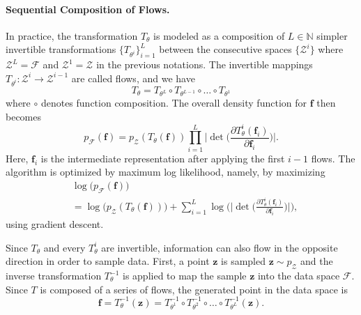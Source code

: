 \documentclass[letterpaper]{article} %
\begin{document}
\paragraph{Sequential Composition of Flows.}

In practice, the transformation $T_\theta$ is modeled as a composition of $L\in \mathbb{N}$ simpler invertible transformations $\{T_{\theta^i}\}_{i=1}^L$ between the consecutive spaces $\{\mathcal{Z}^i\}$ where $\mathcal{Z}^L = \mathcal{F} $ and $\mathcal{Z}^1 = \mathcal{Z}$ in the previous notations. The invertible mappings $T_{\theta^i}: \mathcal{Z}^i \rightarrow \mathcal{Z}^{i-1}$ are called flows, and we have 
\[T_\theta = T_{\theta^L} \circ T_{\theta^{L-1}} \circ \dots \circ T_{\theta^1}\]
where $\circ$ denotes function composition. The overall density function for $\mathbf{f}$ then becomes
\[p_\mathcal{F}(\mathbf{f}) = p_\mathcal{Z}(T_\theta(\mathbf{f}))\prod_{i=1}^{L} \bigg| \det \bigg( \frac{\partial T_\theta^i (\mathbf{f}_i)}{\partial  \mathbf{f}_i}  \bigg) \bigg|. \]
Here, $\mathbf{f}_i$ is the intermediate representation after applying the first $i-1$ flows.  
%
The algorithm is optimized by maximum log likelihood, namely, by maximizing
\begin{align*}
    & \log\big(p_\mathcal{F}(\mathbf{f})\big) \\
    & = \log\big(p_\mathcal{Z}(T_\theta(\mathbf{f}))\big) + \sum_{i=1}^{L} \log\Bigg(\bigg| \det \bigg( \frac{\partial T_\theta^i (\mathbf{f}_i)}{\partial  \mathbf{f}_i}  \bigg) \bigg|\Bigg), 
\end{align*}
using gradient descent.

Since $T_\theta$ and every $T_\theta^i$ are invertible, information can also flow in the opposite direction in order to sample data. First, a point $\mathbf{z}$ is sampled $\mathbf{z} \sim p_\mathcal{Z}$ and the inverse transformation $T_\theta^{-1}$ is applied to map the sample $\mathbf{z}$ into the data space $\mathcal{F}$. Since $T$ is composed of a series of flows, the generated point in the data space is 
\[\mathbf{f} = T_\theta^{-1}(\mathbf{z}) = T_{\theta^1}^{-1} \circ T_{\theta^2}^{-1} \circ \dots \circ T_{\theta^L}^{-1}(\mathbf{z}).\]
\end{document}
